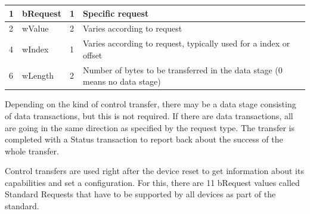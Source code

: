 \documentclass{article}
\begin{document}
\begin{table}[H]
\begin{tabular}{l | l | l | p{5.5cm}}
    1 & bRequest & 1 & Specific request \\ \hline
    2 & wValue & 2 & Varies according to request \\ \hline
    4 & wIndex & 1 & Varies according to request, typically used
    for a index or offset \\ \hline
    6 & wLength & 2 & Number of bytes to be transferred in the data stage
    (0 means no data stage) \\
  \end{tabular}
  \label{table:ctrltransfer}
\end{table}

Depending on the kind of control transfer, there may be a data stage
consisting of data transactions, but this is not required. If there
are data transactions, all are going in the same direction as specified
by the request type.
The transfer is completed with a Status transaction to report back
about the success of the whole transfer.

Control transfers are used right after the device reset to get information about
its capabilities and set a configuration. For this, there are 11 bRequest values
called Standard Requests that have to be supported by all devices as part of the standard.
\end{document}

